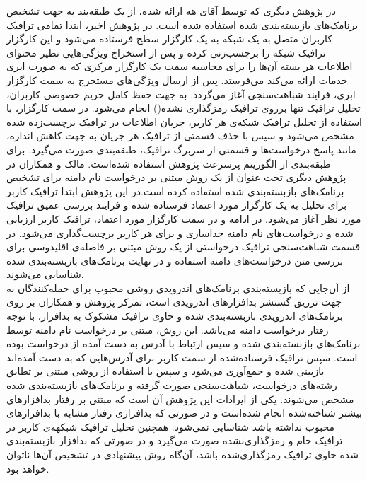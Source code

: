 در پژوهش دیگری که توسط آقای هه ارا‌ئه‌ شده‌، از یک طبقه‌بند به جهت تشخیص برنامک‌های بازبسته‌بندی شده استفاده شده است. در پژوهش اخیر، ابتدا تمامی ترافیک کاربران متصل به یک شبکه به یک کارگزار سطح فرستاده می‌شود و این کارگزار ترافیک شبکه را برچسب‌زنی کرده و پس از استخراج ویژگی‌هایی نظیر محتوای اطلاعات هر بسته آن‌ها را برای محاسبه سمت یک کارگزار مرکزی که به صورت ابری خدمات ارائه می‌کند می‌فرستد. پس از ارسال ویژگی‌های مستخرج به سمت کارگزار ابری، فرایند شباهت‌سنجی آغاز می‌گردد. به جهت حفظ کامل حریم خصوصی کاربران، تحلیل ترافیک تنها برروی ترافیک رمز‌گذاری نشده() انجام می‌شود. در سمت کارگزار، با استفاده از تحلیل ترافیک شبکه‌‌ی هر کاربر، جریان اطلاعات در ترافیک برچسب‌زده شده مشخص می‌شود و سپس با حذف قسمتی از ترافیک هر جریان به جهت کاهش اندازه، مانند پاسخ درخواست‌ها و قسمتی از سربرگ ترافیک، طبقه‌بندی صورت می‌گیرد. برای طبقه‌بندی از الگوریتم پرسرعت پژوهش  استفاده شده‌است. مالک و همکاران در پژوهش دیگری تحت عنوان  از یک روش میتنی بر درخواست نام دامنه برای تشخیص برنامک‌‌های بازبسته‌بندی شده استفاده کرده است.در این پژوهش ابتدا ترافیک کاربر برای تحلیل به یک کارگزار مورد اعتماد فرستاده شده و فرایند بررسی عمیق ترافیک مورد نظر آغاز می‌شود. در ادامه و در سمت کارگزار مورد اعتماد، ترافیک کاربر ارزیابی شده و درخواست‌های نام دامنه جداسازی و برای هر کاربر برچسب‌گذاری می‌شود. در قسمت شباهت‌سنجی ترافیک درخواستی از یک روش مبتنی بر فاصله‌ی اقلیدوسی برای بررسی متن درخواست‌های دامنه استفاده و در نهایت برنامک‌‌های بازبسته‌بندی شده شناسایی می‌شوند.
\\
از آن‌جایی که بازبسته‌بندی برنامک‌های اندرویدی روشی محبوب برای حمله‌کنندگان به جهت تزریق گستشر بدافزار‌های اندرویدی است، تمرکز پژوهش و همکاران بر روی برنامک‌های اندرویدی بازبسته‌بندی شده و حاوی ترافیک مشکوک به بدافزار، با توجه رفتار درخواست دامنه می‌باشد.  این روش، مبتنی بر درخواست نام دامنه توسط برنامک‌های بازبسته‌بندی شده و سپس ارتباط با آدرس به دست آمده از درخواست بوده‌ است. سپس ترافیک فرستاده‌شده از سمت کاربر برای آدرس‌هایی که به دست آمده‌اند بازبینی شده و جمع‌آوری می‌شود و سپس با استفاده از روشی مبتنی بر تطابق رشته‌های درخواست، شباهت‌سنجی صورت گرفته و برنامک‌های بازبسته‌بندی شده مشخص می‌شوند. یکی از ایرادات این پژوهش آن است که مبتنی بر رفتار بدافزار‌های بیشتر شناخته‌شده انجام شده‌است و در صورتی که بدافزاری رفتار مشابه با بدافزار‌های محبوب نداشته باشد شناسایی نمی‌شود. همچنین تحلیل ترافیک شبکهه‌ی کاربر در ترافیک خام و رمزگذاری‌نشده صورت می‌گیرد و در صورتی که بدافزار بازبسته‌بندی شده حاوی ترافیک رمز‌گذاری‌شده باشد، آن‌گاه روش پیشنهادی در تشخیص آن‌ها ناتوان خواهد بود.\\
